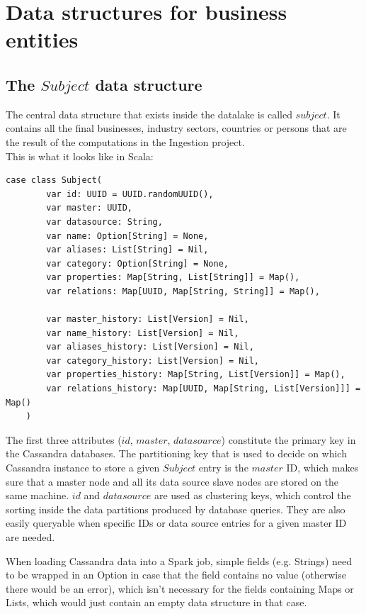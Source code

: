 \documentclass[
        a4paper,     %
        titlepage,   %
        oneside,     %
        parskip      %
        ]{scrartcl}  %
\begin{document}
  \section{Data structures for business entities}
    \subsection{The $Subject$ data structure}
    The central data structure that exists inside the datalake is called $subject$.
    It contains all the final businesses, industry sectors, countries or persons
    that are the result of the computations in the Ingestion project.\\
    This is what it looks like in Scala:
    \begin{lstlisting}[style=scalaStyle,caption=Subject]
    case class Subject(
    	var id: UUID = UUID.randomUUID(),
    	var master: UUID,
    	var datasource: String,
    	var name: Option[String] = None,
    	var aliases: List[String] = Nil,
    	var category: Option[String] = None,
    	var properties: Map[String, List[String]] = Map(),
    	var relations: Map[UUID, Map[String, String]] = Map(),

    	var master_history: List[Version] = Nil,
    	var name_history: List[Version] = Nil,
    	var aliases_history: List[Version] = Nil,
    	var category_history: List[Version] = Nil,
    	var properties_history: Map[String, List[Version]] = Map(),
    	var relations_history: Map[UUID, Map[String, List[Version]]] = Map()
    )
    \end{lstlisting}

    The first three attributes ($id$, $master$, $datasource$) constitute the
    primary key in the Cassandra databases.
    The partitioning key that is used to decide on which Cassandra instance to store
    a given $Subject$ entry is the $master$ ID, which makes sure that a master node
    and all its data source slave nodes are stored on the same machine.
    $id$ and $datasource$ are used as clustering keys, which control the sorting
    inside the data partitions produced by database queries. They are also easily
    queryable when specific IDs or data source entries for a given master ID are
    needed.

    When loading Cassandra data into a Spark job, simple fields (e.g. Strings)
    need to be wrapped in an Option in case that the field contains no value
    (otherwise there would be an error), which isn't necessary for the fields
    containing Maps or Lists, which would just contain an empty data structure
    in that case.
\end{document}
